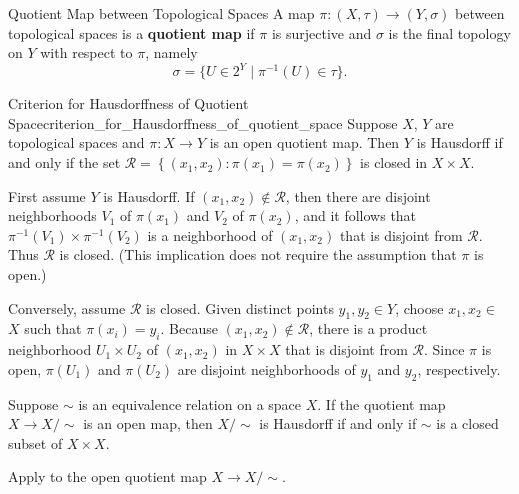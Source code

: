 \documentclass{report}
\begin{document}
\begin{definition}{Quotient Map between Topological Spaces}{}
	A map $\pi:(X,\tau)\to (Y,\sigma)$ between topological spaces is a \textbf{quotient map} if $\pi$ is surjective and $\sigma$ is the final topology on $Y$ with respect to $\pi$, namely
	\[
	\sigma=\{U\in 2^Y\mid \pi^{-1}(U)\in \tau\}.
	\]
\end{definition}

\begin{proposition}{Criterion for Hausdorffness of Quotient Space}{criterion_for_Hausdorffness_of_quotient_space}
	Suppose $X$, $Y$ are topological spaces and $\pi: X \rightarrow Y$ is an open quotient map. Then $Y$ is Hausdorff if and only if the set $\mathcal{R}=\left\{\left(x_1, x_2\right): \pi\left(x_1\right)=\pi\left(x_2\right)\right\}$ is closed in $X \times X$.
\end{proposition}

\begin{prf}
	First assume $Y$ is Hausdorff. If $\left(x_1, x_2\right) \notin \mathcal{R}$, then there are disjoint neighborhoods $V_1$ of $\pi\left(x_1\right)$ and $V_2$ of $\pi\left(x_2\right)$, and it follows that $\pi^{-1}\left(V_1\right) \times \pi^{-1}\left(V_2\right)$ is a neighborhood of $\left(x_1, x_2\right)$ that is disjoint from $\mathcal{R}$. Thus $\mathcal{R}$ is closed. (This implication does not require the assumption that $\pi$ is open.)

	Conversely, assume $\mathcal{R}$ is closed. Given distinct points $y_1, y_2 \in Y$, choose $x_1, x_2 \in$ $X$ such that $\pi\left(x_i\right)=y_i$. Because $\left(x_1, x_2\right) \notin \mathcal{R}$, there is a product neighborhood $U_1 \times U_2$ of $\left(x_1, x_2\right)$ in $X \times X$ that is disjoint from $\mathcal{R}$. Since $\pi$ is open, $\pi\left(U_1\right)$ and $\pi\left(U_2\right)$ are disjoint neighborhoods of $y_1$ and $y_2$, respectively.
\end{prf}

\begin{corollary}{}{}
	Suppose $\sim$ is an equivalence relation on a space $X$. If the quotient map $X \rightarrow X / \sim$ is an open map, then $X / \sim$ is Hausdorff if and only if $\sim$ is a closed subset of $X \times X$.
\end{corollary}
\begin{prf}
	Apply  to the open quotient map $X \rightarrow X / \sim$.
\end{prf}
\end{document}
